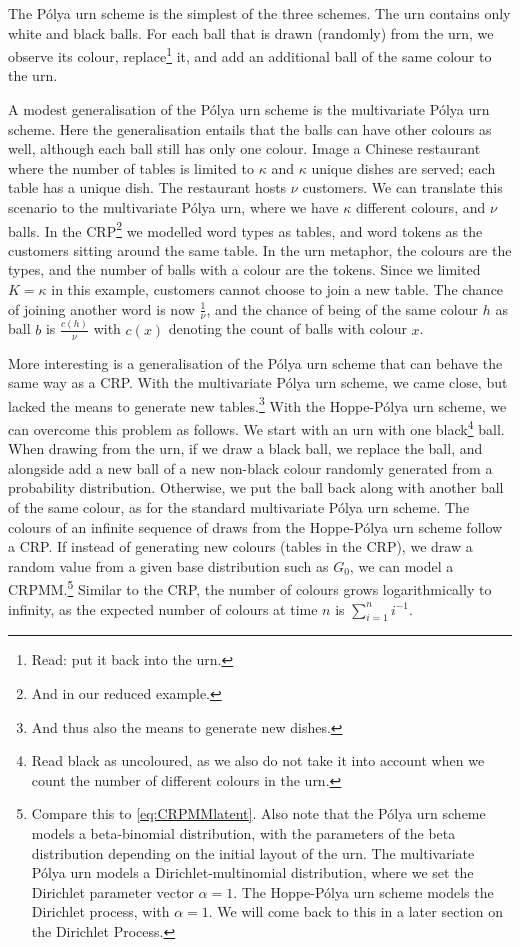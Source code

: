 The P\'olya urn scheme\cite{Johnson1977Urn} is the simplest of the three schemes. The urn contains only white and black balls. For each ball that is drawn (randomly) from the urn, we observe its colour,  replace\footnote{Read: put it back into the urn.} it, and add an additional ball of the same colour to the urn. 

A modest generalisation of the P\'olya urn scheme is the multivariate P\'olya urn scheme. Here the generalisation entails that the balls can have other colours as well, although each ball still has only one colour. Image a Chinese restaurant where the number of tables is limited to $\kappa$ and $\kappa$ unique dishes are served; each table has a unique dish. The restaurant hosts $\nu$ customers. We can translate this scenario to the multivariate P\'olya urn, where we have $\kappa$ different colours, and $\nu$ balls. In the CRP\footnote{And in our reduced example.} we modelled word types as tables, and word tokens as the customers sitting around the same table. In the urn metaphor, the colours are the types, and the number of balls with a colour are the tokens. Since we limited $K=\kappa$ in this example, customers cannot choose to join a new table. The chance of joining another word is now $\frac{1}{\nu}$, and the chance of being of the same colour $h$ as ball $b$ is $\frac{c(h)}{\nu}$ with $c(x)$ denoting the count of balls with colour $x$. 

More interesting is a generalisation of the P\'olya urn scheme that can behave the same way as a CRP. With the multivariate P\'olya urn scheme, we came close, but lacked the means to generate new tables.\footnote{And thus also the means to generate new dishes.} With the Hoppe-P\'olya urn scheme\cite{Hoppe1984Polya}, we can overcome this problem as follows. We start with an urn with one black\footnote{Read black as uncoloured, as we also do not take it into account when we count the number of different colours in the urn.} ball. When drawing from the urn, if we draw a black ball, we replace the ball, and alongside add a new ball of a new non-black colour randomly generated from a probability distribution. Otherwise, we put the ball back along with another ball of the same colour, as for the standard multivariate P\'olya urn scheme. The colours of an infinite sequence of draws from the Hoppe-P\'olya urn scheme follow a CRP. If instead of generating new colours (tables in the CRP), we draw a random value from a given base distribution such as $G_0$, we can model a CRPMM.\footnote{Compare this to \cref{eq:CRPMMlatent}. Also note that the P\'olya urn scheme models a beta-binomial distribution, with the parameters of the beta distribution depending on the initial layout of the urn. The multivariate P\'olya urn models a Dirichlet-multinomial distribution, where we set the Dirichlet parameter vector $\alpha=1$. The Hoppe-P\'olya urn scheme models the Dirichlet process, with $\alpha=1$. We will come back to this in a later section on the Dirichlet Process.} Similar to the CRP, the number of colours grows logarithmically to infinity, as the expected number of colours at time $n$ is $\sum_{i=1}^n i^{-1}$.

